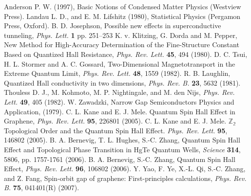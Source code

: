 \documentclass[titlepage,a4paper]{book}
\begin{document}



\begin{thebibliography}{99}
Anderson P. W. (1997), Basic Notions of Condensed Matter Physics (Westview Press).
Landau L. D., and E. M. Lifshitz (1980), Statistical Physics (Pergamon Press, Oxford).
B. D. Josephson, Possible new effects in superconductive tunneling, \textit{Phys. Lett.} \textbf{1} pp. 251–253 
K. v. Klitzing, G. Dorda and M. Pepper, New Method for High-Accuracy Determination of the Fine-Structure Constant Based on Quantized Hall Resistance, \textit{Phys. Rev. Lett.} \textbf{45}, 494 (1980).
D. C. Tsui, H. L. Stormer and A. C. Gossard, Two-Dimensional Magnetotransport in the Extreme Quantum Limit, \textit{Phys. Rev. Lett.} \textbf{48}, 1559 (1982).
R. B. Laughlin, Quantized Hall conductivity in two dimensions, \textit{Phys. Rev. B.} \textbf{23}, 5632 (1981).
Thouless D. J., M. Kohmoto, M. P. Nightingale, and M. den Nijs, \textit{Phys. Rev. Lett.} \textbf{49}, 405 (1982).
W. Zawadzki, Narrow Gap Semiconductors Physics and Application, (1979).
C. L. Kane and E. J. Mele. Quantum Spin Hall Effect in Graphene, \textit{Phys. Rev. Lett.} \textbf{95}, 226801 (2005).
C. L. Kane and E. J. Mele. $\mathbb{Z_2}$ Topological Order and the Quantum Spin Hall Effect. \textit{Phys. Rev. Lett.} \textbf{95}, 146802 (2005).
B. A. Bernevig, T. L. Hughes, S.-C. Zhang, Quantum Spin Hall Effect and Topological Phase Transition in HgTe Quantum Wells, \textit{Science} \textbf{314}, 5806, pp. 1757-1761 (2006).
B. A. Bernevig, S.-C. Zhang, Quantum Spin Hall Effect, \textit{Phys. Rev. Lett.} \textbf{96}, 106802 (2006).
Y. Yao, F. Ye, X.-L. Qi, S.-C. Zhang, and Z. Fang, Spin-orbit gap of graphene: First-principles calculations, \textit{Phys. Rev. B.} \textbf{75}, 041401(R) (2007).

\end{thebibliography}
\end{document}
